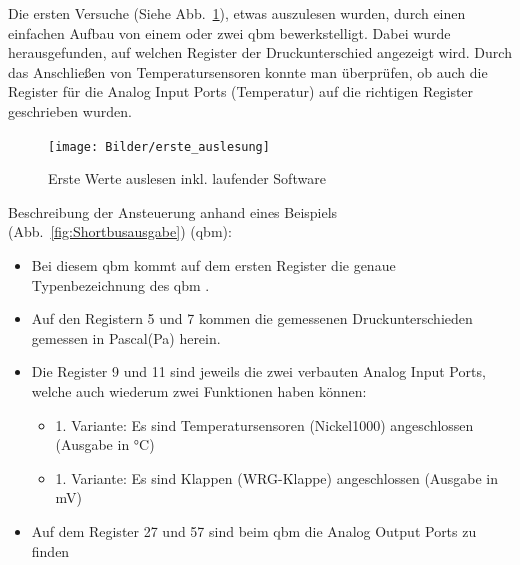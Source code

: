 Die ersten Versuche (Siehe  Abb.~\ref{fig:ersteauslesung}), etwas auszulesen wurden, durch einen einfachen Aufbau von einem oder zwei \gls{qbm}  bewerkstelligt. Dabei wurde herausgefunden, auf welchen Register der Druckunterschied angezeigt wird. Durch das Anschließen von Temperatursensoren konnte man überprüfen, ob auch die Register für die Analog Input Ports (Temperatur) auf die richtigen Register geschrieben wurden.

\begin{figure}[H]
	\centering
	\texttt{[image: Bilder/erste\_auslesung]}
	\caption{Erste Werte auslesen inkl. laufender Software} 
	\label{fig:ersteauslesung}
\end{figure}

Beschreibung der Ansteuerung anhand eines Beispiels (Abb.~\ref{fig:Shortbusausgabe}) (\gls{qbm}):
\begin{itemize}
	\item Bei diesem \gls{qbm}  kommt auf dem ersten Register die genaue Typenbezeichnung des \gls{qbm} .  
	\item Auf den Registern 5 und 7 kommen die gemessenen Druckunterschieden gemessen in Pascal(Pa) herein. 
	\item Die Register 9 und 11 sind jeweils die zwei verbauten Analog Input Ports, welche auch wiederum zwei Funktionen haben können:
	\begin{itemize}
		\item 1. Variante: Es sind Temperatursensoren (\zB Nickel1000) angeschlossen (Ausgabe in °C)
		\item 1. Variante: Es sind Klappen (\zB WRG-Klappe) angeschlossen (Ausgabe in mV)
	\end{itemize}
	\item Auf dem Register 27 und 57 sind beim \gls{qbm} die Analog Output Ports zu finden
	
	\cite[vgl.][]{siemens:2021}
\end{itemize} 
 